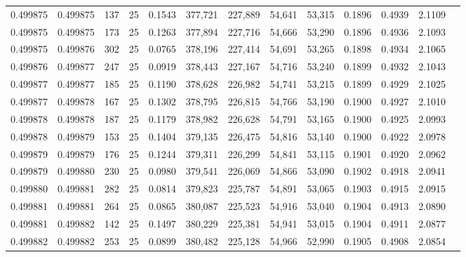 \begin{tabular}{rrrrrrrrrrrrr}
0.499875 & 0.499875 & 137 &  25 &                                     0.1543 & 377,721 & 227,889 &  54,641 &  53,315 & 0.1896 & 0.4939 & 2.1109 \\
0.499875 & 0.499875 & 173 &  25 &                                     0.1263 & 377,894 & 227,716 &  54,666 &  53,290 & 0.1896 & 0.4936 & 2.1093 \\
0.499875 & 0.499876 & 302 &  25 &                                     0.0765 & 378,196 & 227,414 &  54,691 &  53,265 & 0.1898 & 0.4934 & 2.1065 \\
0.499876 & 0.499877 & 247 &  25 &                                     0.0919 & 378,443 & 227,167 &  54,716 &  53,240 & 0.1899 & 0.4932 & 2.1043 \\
0.499877 & 0.499877 & 185 &  25 &                                     0.1190 & 378,628 & 226,982 &  54,741 &  53,215 & 0.1899 & 0.4929 & 2.1025 \\
0.499877 & 0.499878 & 167 &  25 &                                     0.1302 & 378,795 & 226,815 &  54,766 &  53,190 & 0.1900 & 0.4927 & 2.1010 \\
0.499878 & 0.499878 & 187 &  25 &                                     0.1179 & 378,982 & 226,628 &  54,791 &  53,165 & 0.1900 & 0.4925 & 2.0993 \\
0.499878 & 0.499879 & 153 &  25 &                                     0.1404 & 379,135 & 226,475 &  54,816 &  53,140 & 0.1900 & 0.4922 & 2.0978 \\
0.499879 & 0.499879 & 176 &  25 &                                     0.1244 & 379,311 & 226,299 &  54,841 &  53,115 & 0.1901 & 0.4920 & 2.0962 \\
0.499879 & 0.499880 & 230 &  25 &                                     0.0980 & 379,541 & 226,069 &  54,866 &  53,090 & 0.1902 & 0.4918 & 2.0941 \\
0.499880 & 0.499881 & 282 &  25 &                                     0.0814 & 379,823 & 225,787 &  54,891 &  53,065 & 0.1903 & 0.4915 & 2.0915 \\
0.499881 & 0.499881 & 264 &  25 &                                     0.0865 & 380,087 & 225,523 &  54,916 &  53,040 & 0.1904 & 0.4913 & 2.0890 \\
0.499881 & 0.499882 & 142 &  25 &                                     0.1497 & 380,229 & 225,381 &  54,941 &  53,015 & 0.1904 & 0.4911 & 2.0877 \\
0.499882 & 0.499882 & 253 &  25 &                                     0.0899 & 380,482 & 225,128 &  54,966 &  52,990 & 0.1905 & 0.4908 & 2.0854 \\

\end{tabular}
